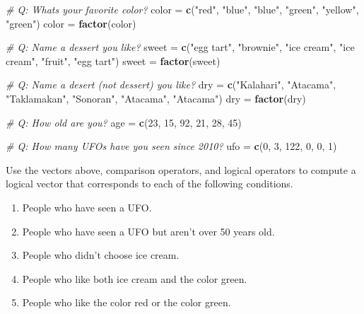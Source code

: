 \documentclass[
]{article}
\newenvironment{Shaded}{\begin{snugshade}}{\end{snugshade}}
\newcommand{\CommentTok}[1]{\textcolor[rgb]{0.56,0.35,0.01}{\textit{#1}}}
\newcommand{\DecValTok}[1]{\textcolor[rgb]{0.00,0.00,0.81}{#1}}
\newcommand{\KeywordTok}[1]{\textcolor[rgb]{0.13,0.29,0.53}{\textbf{#1}}}
\newcommand{\NormalTok}[1]{#1}
\newcommand{\StringTok}[1]{\textcolor[rgb]{0.31,0.60,0.02}{#1}}
\begin{document}
\begin{Shaded}
\begin{Highlighting}[]
\CommentTok{\# Q: What\textquotesingle{}s your favorite color?}
\NormalTok{color =}\StringTok{ }\KeywordTok{c}\NormalTok{(}\StringTok{"red"}\NormalTok{, }\StringTok{"blue"}\NormalTok{, }\StringTok{"blue"}\NormalTok{, }\StringTok{"green"}\NormalTok{, }\StringTok{"yellow"}\NormalTok{, }\StringTok{"green"}\NormalTok{)}
\NormalTok{color =}\StringTok{ }\KeywordTok{factor}\NormalTok{(color)}

\CommentTok{\# Q: Name a dessert you like?}
\NormalTok{sweet =}\StringTok{ }\KeywordTok{c}\NormalTok{(}\StringTok{"egg tart"}\NormalTok{, }\StringTok{"brownie"}\NormalTok{, }\StringTok{"ice cream"}\NormalTok{, }\StringTok{"ice cream"}\NormalTok{, }\StringTok{"fruit"}\NormalTok{, }\StringTok{"egg tart"}\NormalTok{)}
\NormalTok{sweet =}\StringTok{ }\KeywordTok{factor}\NormalTok{(sweet)}

\CommentTok{\# Q: Name a desert (not dessert) you like?}
\NormalTok{dry =}\StringTok{ }\KeywordTok{c}\NormalTok{(}\StringTok{"Kalahari"}\NormalTok{, }\StringTok{"Atacama"}\NormalTok{, }\StringTok{"Taklamakan"}\NormalTok{, }\StringTok{"Sonoran"}\NormalTok{, }\StringTok{"Atacama"}\NormalTok{, }\StringTok{"Atacama"}\NormalTok{)}
\NormalTok{dry =}\StringTok{ }\KeywordTok{factor}\NormalTok{(dry)}

\CommentTok{\# Q: How old are you?}
\NormalTok{age =}\StringTok{ }\KeywordTok{c}\NormalTok{(}\DecValTok{23}\NormalTok{, }\DecValTok{15}\NormalTok{, }\DecValTok{92}\NormalTok{, }\DecValTok{21}\NormalTok{, }\DecValTok{28}\NormalTok{, }\DecValTok{45}\NormalTok{)}

\CommentTok{\# Q: How many UFOs have you seen since 2010?}
\NormalTok{ufo =}\StringTok{ }\KeywordTok{c}\NormalTok{(}\DecValTok{0}\NormalTok{, }\DecValTok{3}\NormalTok{, }\DecValTok{122}\NormalTok{, }\DecValTok{0}\NormalTok{, }\DecValTok{0}\NormalTok{, }\DecValTok{1}\NormalTok{)}
\end{Highlighting}
\end{Shaded}

Use the vectors above, comparison operators, and logical operators to
compute a logical vector that corresponds to each of the following
conditions.

\begin{enumerate}
\def\labelenumi{\arabic{enumi}.}
\item
  People who have seen a UFO.
\item
  People who have seen a UFO but aren't over 50 years old.
\item
  People who didn't choose ice cream.
\item
  People who like both ice cream and the color green.
\item
  People who like the color red or the color green.
\end{enumerate}
\end{document}
